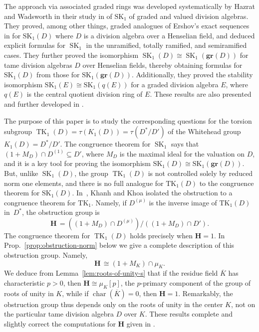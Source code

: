 \documentclass[11pt]{article}
\numberwithin{equation}{section}
\theoremstyle{plain}
\theoremstyle{remark}
\newcommand{\gr}{\mathbf{gr}}
\newcommand{\grd}{\gr(D)}
\newcommand{\opn}{\operatorname}
\newcommand{\SK}{\opn{SK_1}}
\newcommand{\TK}{\opn{TK_1}}
\begin{document}
The  approach via associated graded rings was developed systematically by Hazrat and Wadsworth in their study 
in \cite{hazrat-wadsworth-2011} of $\SK$ of graded and valued division algebras. They proved, among other things, 
graded analogues of Ershov's exact sequences in \cite{ershov-1982} for $\SK(D)$ where $D$ is a division algebra over 
a Henselian field, and 
deduced explicit formulas for $\operatorname{SK}_1$ in the unramified, totally ramified, and semiramified cases.  
They further proved  the isomorphism 
$\opn{SK}_1(D)\cong\opn{SK}_1(\grd)$ for tame division algebras $D$ over Henselian fields,
thereby obtaining formulas for $\SK(D)$ from those for $\SK(\gr(D))$. Additionally, they proved  the stability isomorphism 
$\SK(E)\cong \SK(q(E))$ for a graded division algebra $E$, where $q(E)$ is the central quotient division ring of $E$. 
These results are also presented and further developed in \cite[Ch.~11]{tignol-wadsworth-2015}.

The purpose of this paper is to study the corresponding questions for the torsion subgroup $\operatorname{TK}_1(D)=\tau(K_1(D))=\tau(D^*/D')$ of the Whitehead group $K_1(D) = D^*/D'$. The congruence theorem for 
$\operatorname{SK}_1$ says that $(1+M_D)\cap D^{(1)}\subseteq D'$, where $M_D$ is the maximal ideal for the 
valuation on $D$, and it is a key tool for proving the isomorphism $\SK(D) \cong \SK(\gr(D))$. But, 
unlike $\operatorname{SK}_1(D)$, the group 
$\operatorname{TK}_1(D)$ is not controlled solely by reduced norm one elements, and there is no 
full analogue for $\TK(D)$ to the congruence theorem for $\SK(D)$.   
In~\cite{khanh-khoa-2025}, Khanh and Khoa isolated the  obstruction to a congruence theorem for $\TK$. 
Namely, if $D^{(\mu)}$ is the inverse image of $\TK(D)$ in~$D^*$, the obstruction group is
$$
        \mathbf{H}\,=((1+M_D)\cap D^{(\mu)})\big/((1+M_D)\cap D').
$$
The congruence theorem for $\operatorname{TK}_1(D)$ holds precisely when $\mathbf{H}=1$.
In Prop.~\ref{prop:obstruction-norm}  below we give a complete description of this obstruction group. Namely,
$$
        \mathbf{H}\,\cong (1+M_K)\cap\mu_K.
$$
We deduce from Lemma~\ref{lem:roots-of-unity-s} that  if the residue field $\overline K$ has characteristic $p>0$, then $\mathbf{H}\cong\mu_K[p]$, the $p$-primary component of the group of roots of unity in $K$,  while if 
$\operatorname{char}(\overline K)=0$, then $\mathbf{H}=1$. Remarkably, the obstruction group thus depends only 
on the roots of unity in the  
center $K$, not on the particular tame division algebra $D$ over $K$. These results  complete and slightly correct 
the computations for $\mathbf{H}$  given in \cite{khanh-khoa-2025}.
\end{document}
